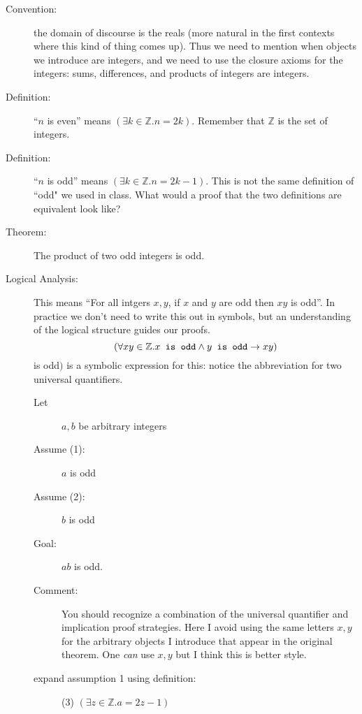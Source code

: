 \documentclass[12pt]{article}
\begin{document}
\begin{description}

\item[Convention:] the domain of discourse is the reals (more natural in the first contexts where this kind of thing comes up).  Thus we need to mention when objects we introduce are integers, and we need to use the closure axioms
for the integers:  sums, differences, and products of integers are integers.

\item[Definition:]  ``$n$ is even'' means $(\exists k\in {\mathbb Z}.n=2k)$.  Remember that $\mathbb Z$ is the set of integers.

\item[Definition:]  ``$n$ is odd'' means $(\exists k\in {\mathbb Z}.n=2k-1)$.  This is not the same definition of ``odd" we used in class.  What would a proof that the two definitions are equivalent look like?

\item[Theorem:]  The product of two odd integers is odd.

\item[Logical Analysis:] This means ``For all intgers $x,y$, if $x$ and $y$ are
odd then $xy$ is odd''.  In practice we don't need to write this out
in symbols, but an understanding of the logical structure guides our
proofs.  $$(\forall xy \in \mathbb Z. x\verb| is odd|\wedge y\verb| is odd|\rightarrow xy)$$
is odd$)$ is a symbolic expression for this: notice the abbreviation
for two universal quantifiers.

\begin{description}

\item[Let] $a,b$ be arbitrary integers

\item [Assume (1):]  $a$ is odd

\item [Assume (2):]  $b$ is odd

\item[Goal:]  $ab$ is odd.

\item[Comment:]  You should recognize a combination of the universal quantifier and implication proof strategies.  Here I avoid using the same letters $x,y$ for the arbitrary objects I introduce that appear in the original theorem.  One {\em can\/} use $x,y$ but I think this is better style.

\item [expand assumption 1 using definition:]  (3) $(\exists z\in \mathbb Z.a=2z-1)$


\end{description}
\end{description}
\end{document}
